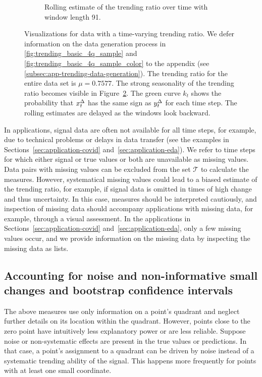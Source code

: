 \begin{figure}
\begin{subfigure}[t]{.48\textwidth}
    \caption{Rolling estimate of the trending ratio over time with window length 91. }\label{fig:trending_ratio_time_series}
    \end{subfigure}%
    \caption{Visualizations for data with a time-varying trending ratio. We defer information on the data generation process in \ref{fig:trending_basic_4q_sample} and \ref{fig:trending_basic_4q_sample_color} to the appendix (see \ref{subsec:app-trending-data-generation}). The trending ratio for the entire data set is $\mu = 0.7577$. The strong seasonality of the trending ratio becomes visible in Figure~\ref{fig:trending_ratio_time_series}. The green curve $k_t$ shows the probability that $x^{\Delta}_{t}$ has the same sign as $y^{\Delta}_{t}$ for each time step. The rolling estimates are delayed as the windows look backward.}
\end{figure} 

In applications, signal data are often not available for all time steps, for example, due to technical problems or delays in data transfer (see the examples in Sections~\ref{sec:application-covid} and~\ref{sec:application-eda}).
We refer to time steps for which either signal or true values or both are unavailable as missing values.
Data pairs with missing values can be excluded from the set $\mathcal{T}$ to calculate the measures. 
However, systematical missing values could lead to a biased estimate of the trending ratio, for example, if signal data is omitted in times of high change and thus uncertainty.
In this case, measures should be interpreted cautiously, and
inspection of missing data should accompany applications with missing data, for example, through a visual assessment.
In the applications in Sections~\ref{sec:application-covid} and~\ref{sec:application-eda}, only a few missing values occur, and we provide information on the missing data by inspecting the missing data as lists.

\subsection{Accounting for noise and non-informative small changes and bootstrap confidence intervals}\label{subsec:trending-noise}

The above measures use only information on a point's quadrant and neglect further details on its location within the quadrant.
However, points close to the zero point have intuitively less explanatory power or are less reliable.
Suppose noise or non-systematic effects are present in the true values or predictions. In that case, a point's assignment to a quadrant can be driven by noise instead of a systematic trending ability of the signal.
This happens more frequently for points with at least one small coordinate.

